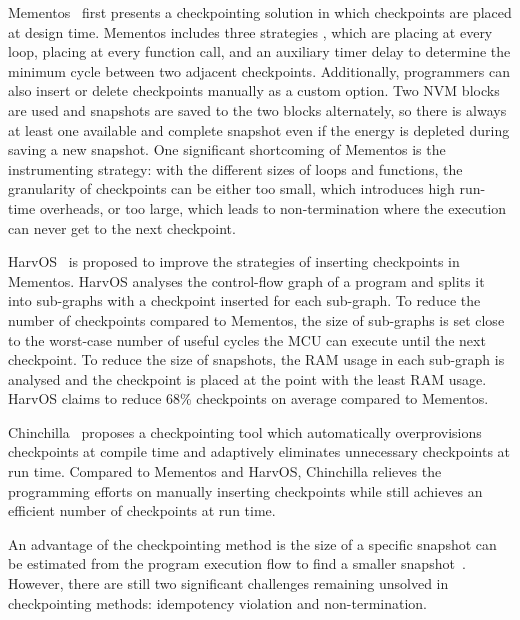 Mementos~\cite{ransford2012mementos} first presents a checkpointing solution in which checkpoints are placed at design time. 
Mementos includes three strategies , which are placing at every loop, placing at every function call, and an auxiliary timer delay to determine the minimum cycle between two adjacent checkpoints. 
Additionally, programmers can also insert or delete checkpoints manually as a custom option. 
Two NVM blocks are used and snapshots are saved to the two blocks alternately, so there is always at least one available and complete snapshot even if the energy is depleted during saving a new snapshot. 
One significant shortcoming of Mementos is the instrumenting strategy: with the different sizes of loops and functions, the granularity of checkpoints can be either too small, which introduces high run-time overheads, or too large, which leads to non-termination where the execution can never get to the next checkpoint. 

HarvOS~\cite{bhatti2017harvos} is proposed to improve the strategies of inserting checkpoints in Mementos. HarvOS analyses the control-flow graph of a program and splits it into sub-graphs with a checkpoint inserted for each sub-graph. To reduce the number of checkpoints compared to Mementos, the size of sub-graphs is set close to the worst-case number of useful cycles the MCU can execute until the next checkpoint. To reduce the size of snapshots, the RAM usage in each sub-graph is analysed and the checkpoint is placed at the point with the least RAM usage. HarvOS claims to reduce 68\% checkpoints on average compared to Mementos.

Chinchilla~\cite{maeng2018adaptive} proposes a checkpointing tool which automatically overprovisions checkpoints at compile time and adaptively eliminates unnecessary checkpoints at run time. Compared to Mementos and HarvOS, Chinchilla relieves the programming efforts on manually inserting checkpoints while still achieves an efficient number of checkpoints at run time.

An advantage of the checkpointing method is the size of a specific snapshot can be estimated from the program execution flow to find a smaller snapshot~\cite{bhatti2017harvos}. However, there are still two significant challenges remaining unsolved in checkpointing methods: idempotency violation and non-termination. 

